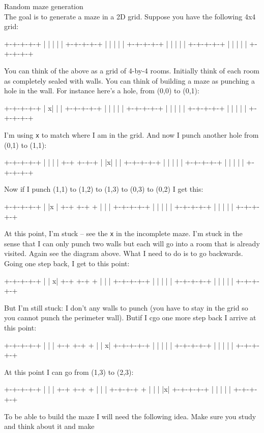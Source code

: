 Random maze generation\\
The goal is to generate a maze in a 2D grid.
Suppose you have the following 4x4 grid:
\begin{console}
+-+-+-+-+
| | | | |
+-+-+-+-+
| | | | |
+-+-+-+-+
| | | | |
+-+-+-+-+
| | | | |
+-+-+-+-+
\end{console}
You can think of the above as a grid of 4-by-4 rooms.
Initially think of each room as completely sealed with walls.
You can think of building a maze as punching a hole in the wall.
For instance here's a hole, from (0,0) to (0,1):
\begin{console}
+-+-+-+-+
|  x| | |
+-+-+-+-+
| | | | |
+-+-+-+-+
| | | | |
+-+-+-+-+
| | | | |
+-+-+-+-+
\end{console}
I'm using \texttt{x} to match where I am in the grid.
And now I punch another hole from (0,1) to (1,1):
\begin{console}
+-+-+-+-+
|   | | |
+-+ +-+-+
| |x| | |
+-+-+-+-+
| | | | |
+-+-+-+-+
| | | | |
+-+-+-+-+
\end{console}
Now if I punch (1,1) to (1,2) to (1,3) to (0,3) to (0,2) I get this:
\begin{console}
+-+-+-+-+
|   |x  |
+-+ +-+ +
| |     |
+-+-+-+-+
| | | | |
+-+-+-+-+
| | | | |
+-+-+-+-+
\end{console}
At this point, I'm stuck -- see the \texttt{x} in the incomplete maze.
I'm stuck in the sense that I can only punch two walls but each will
go into a room that is already visited. Again see the diagram above.
What I need to do is to go backwards.
Going one step back, I get to this point:
\begin{console}
+-+-+-+-+
|   |  x|
+-+ +-+ +
| |     |
+-+-+-+-+
| | | | |
+-+-+-+-+
| | | | |
+-+-+-+-+
\end{console}
But I'm still stuck: I don't any walls to punch (you have to stay in
the grid so you cannot punch the perimeter wall).
Butif I cgo one more step back I arrive at this point:
\begin{console}
+-+-+-+-+
|   |   |
+-+ +-+ +
| |    x|
+-+-+-+-+
| | | | |
+-+-+-+-+
| | | | |
+-+-+-+-+
\end{console}
At this point I can go from (1,3) to (2,3):
\begin{console}
+-+-+-+-+
|   |   |
+-+ +-+ +
| |     |
+-+-+-+ +
| | | |x|
+-+-+-+-+
| | | | |
+-+-+-+-+
\end{console}
To be able to build the maze I will need the following idea.
Make sure you study and think about it and make
